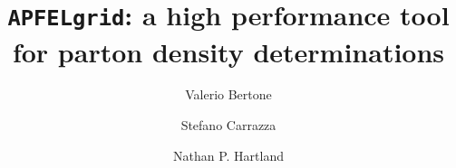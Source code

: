 \documentclass[preprint,12pt]{elsarticle}
\begin{document}
 
 \begin{frontmatter}



\title{{\tt APFELgrid}: a high performance tool for parton density determinations}


\author[a]{Valerio Bertone}
\author[b]{Stefano Carrazza}
\author[a]{Nathan P. Hartland}

\address[a]{Rudolf Peierls Centre for Theoretical Physics,\\ 1 Keble Road, University of Oxford, OX1 3NP, Oxford, UK}
\address[b]{Theoretical Physics Department, CERN, Geneva, Switzerland}


\end{frontmatter}
\end{document}
